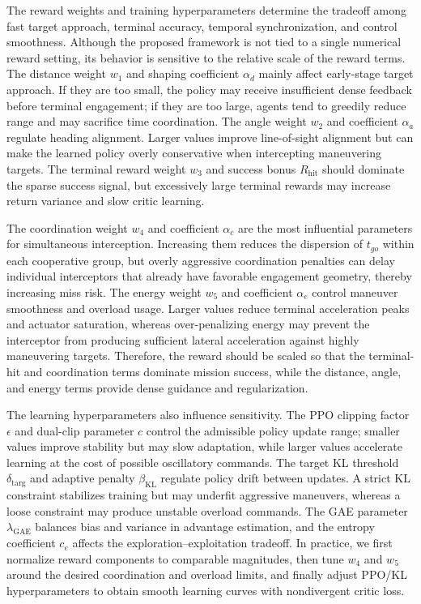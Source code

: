 \documentclass[lettersize,journal]{IEEEtran}
\begin{document}
The reward weights and training hyperparameters determine the tradeoff among fast target
approach, terminal accuracy, temporal synchronization, and control smoothness. Although the
proposed framework is not tied to a single numerical reward setting, its behavior is sensitive
to the relative scale of the reward terms. The distance weight $w_1$ and shaping coefficient
$\alpha_d$ mainly affect early-stage target approach. If they are too small, the policy may
receive insufficient dense feedback before terminal engagement; if they are too large, agents
tend to greedily reduce range and may sacrifice time coordination. The angle weight $w_2$ and
coefficient $\alpha_a$ regulate heading alignment. Larger values improve line-of-sight
alignment but can make the learned policy overly conservative when intercepting maneuvering
targets. The terminal reward weight $w_3$ and success bonus $R_{\text{hit}}$ should dominate
the sparse success signal, but excessively large terminal rewards may increase return variance
and slow critic learning.

The coordination weight $w_4$ and coefficient $\alpha_c$ are the most influential parameters
for simultaneous interception. Increasing them reduces the dispersion of $t_{go}$ within each
cooperative group, but overly aggressive coordination penalties can delay individual
interceptors that already have favorable engagement geometry, thereby increasing miss risk.
The energy weight $w_5$ and coefficient $\alpha_e$ control maneuver smoothness and overload
usage. Larger values reduce terminal acceleration peaks and actuator saturation, whereas
over-penalizing energy may prevent the interceptor from producing sufficient lateral
acceleration against highly maneuvering targets. Therefore, the reward should be scaled so
that the terminal-hit and coordination terms dominate mission success, while the distance,
angle, and energy terms provide dense guidance and regularization.

The learning hyperparameters also influence sensitivity. The PPO clipping factor $\epsilon$
and dual-clip parameter $c$ control the admissible policy update range; smaller values improve
stability but may slow adaptation, while larger values accelerate learning at the cost of
possible oscillatory commands. The target KL threshold $\delta_{\text{targ}}$ and adaptive
penalty $\beta_{\mathrm{KL}}$ regulate policy drift between updates. A strict KL constraint
stabilizes training but may underfit aggressive maneuvers, whereas a loose constraint may
produce unstable overload commands. The GAE parameter $\lambda_{\mathrm{GAE}}$ balances bias
and variance in advantage estimation, and the entropy coefficient $c_e$ affects the
exploration--exploitation tradeoff. In practice, we first normalize reward components to
comparable magnitudes, then tune $w_4$ and $w_5$ around the desired coordination and overload
limits, and finally adjust PPO/KL hyperparameters to obtain smooth learning curves with
nondivergent critic loss.
\end{document}
